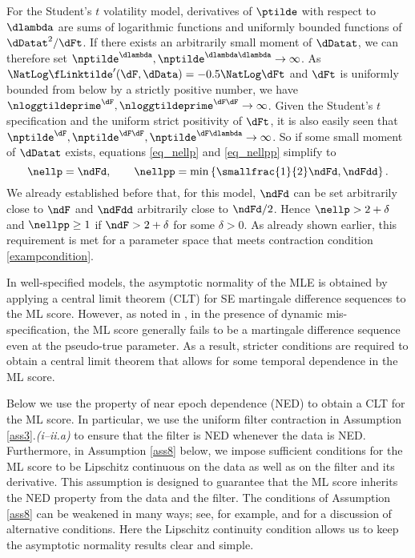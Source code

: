\begin{exmc} %
For the Student's $t$ volatility model, derivatives of $\ptilde$ with respect to $\dlambda$ are sums of logarithmic functions and uniformly bounded functions of $\dDatat^2/\dFt$. If there exists an arbitrarily small moment of $\dDatat$, we can therefore set 
$\nptilde^{\dlambda}, \nptilde^{\dlambda \dlambda} \to\infty$.
As $\NatLog \fLinktilde'(\dF,\dData) = -0.5\NatLog\dFt$ and $\dFt$ is uniformly bounded from below by a strictly positive number, we have $\nloggtildeprime^{\dF}, \nloggtildeprime^{\dF \dF} \to\infty$.
Given the Student's $t$ specification and the uniform strict positivity of $\dFt$, it is also easily seen that
$\nptilde^{\dF}, \nptilde^{\dF \dF}, \nptilde^{\dF \dlambda} \to\infty$.
So if some small moment of $\dDatat$ exists, equations \eqref{eq_nellp} and \eqref{eq_nellpp} simplify to
\[
    \nellp = \ndFd, 
    \qquad
    \nellpp = \min\left\{ \smallfrac{1}{2}\ndFd, \ndFdd \right\}.
\]
We already established before that, for this model, $\ndFd$ can be set arbitrarily close to $\ndF$ and $\ndFdd$ arbitrarily close to $\ndFd/2$. Hence $\nellp >  2+\delta$ and $\nellpp \geq 1$ if $\ndF > 2+\delta$ for some $\delta>0$. As already shown earlier, this requirement is met for a parameter space that meets contraction condition \eqref{exampcondition}.
\end{exmc}



In well-specified models, the asymptotic normality of the MLE is obtained by applying a central limit theorem (CLT) for SE martingale difference sequences to the ML score. However, as noted in \citet{RePEc:cup:cbooks:9780521252805}, in the presence of dynamic mis-specification, the ML score generally fails to be a martingale difference sequence even at the pseudo-true parameter. As a result, stricter conditions are required to obtain a central limit theorem that allows for some temporal dependence in the ML score. 

Below we use the property of near epoch dependence (NED) to obtain a CLT for the ML score. In particular, we use the uniform filter contraction in Assumption \ref{ass3}.\textit{(i--ii.a)} to ensure that the filter is NED whenever the data is NED. Furthermore, in Assumption \ref{ass8} below, we impose sufficient conditions for the ML score to be Lipschitz continuous on the data as well as on the filter and its derivative. This assumption is designed to guarantee that the ML score inherits the NED property from the data and the filter. The conditions of Assumption \ref{ass8}  can be weakened in many ways; see, for example, \citet{davidson1994} and \citet{potscherprucha1997} for a discussion of alternative conditions. Here the Lipschitz continuity condition allows us to keep the asymptotic normality results clear and simple.

